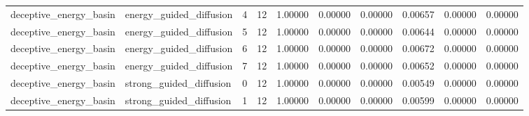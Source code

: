 \documentclass{article}
\begin{document}
\begin{table}[tbp]
{\begin{tabular}{llllllllll}
deceptive\_energy\_basin & energy\_guided\_diffusion & 4 & 12 & 1.00000 & 0.00000 & 0.00000 & 0.00657 & 0.00000 & 0.00000 \\
deceptive\_energy\_basin & energy\_guided\_diffusion & 5 & 12 & 1.00000 & 0.00000 & 0.00000 & 0.00644 & 0.00000 & 0.00000 \\
deceptive\_energy\_basin & energy\_guided\_diffusion & 6 & 12 & 1.00000 & 0.00000 & 0.00000 & 0.00672 & 0.00000 & 0.00000 \\
deceptive\_energy\_basin & energy\_guided\_diffusion & 7 & 12 & 1.00000 & 0.00000 & 0.00000 & 0.00652 & 0.00000 & 0.00000 \\
deceptive\_energy\_basin & strong\_guided\_diffusion & 0 & 12 & 1.00000 & 0.00000 & 0.00000 & 0.00549 & 0.00000 & 0.00000 \\
deceptive\_energy\_basin & strong\_guided\_diffusion & 1 & 12 & 1.00000 & 0.00000 & 0.00000 & 0.00599 & 0.00000 & 0.00000 \\
\bottomrule
\end{tabular}
}
\end{table}

\clearpage
\end{document}
